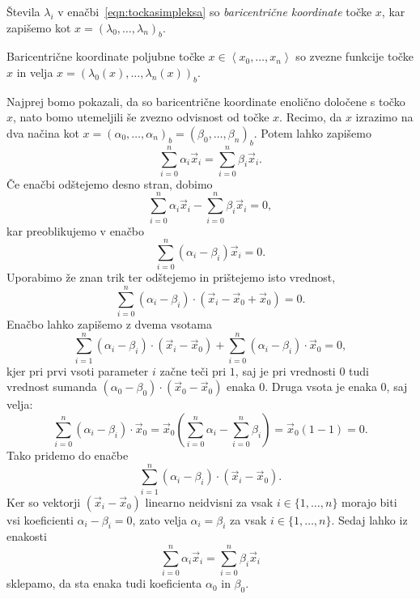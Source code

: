 \documentclass[mat1]{fmfdelo}
\newcommand{\0}{\underline{0}}
\begin{document}
Števila $\lambda_i$ v enačbi~\eqref{eqn:tockasimpleksa} so \emph{baricentrične koordinate} točke $x$, kar zapišemo kot $x = (\lambda_0, \dots, \lambda_n)_b$.
\begin{trditev}\label{trd:zveznost-baricentra}
Baricentrične koordinate poljubne točke $x \in \left <x_0, \dots, x_n \right >$ so zvezne funkcije točke $x$ in velja $x = (\lambda_0(x), \dots, \lambda_n(x))_b$.
\end{trditev}
\begin{dokaz}
Najprej bomo pokazali, da so baricentrične koordinate enolično določene s točko $x$, nato bomo utemeljili še zvezno odvisnost od točke $x$. Recimo, da $x$ izrazimo na dva načina kot $x = \left (\alpha_0, \dots, \alpha_n \right )_b = \left (\beta_0, \dots, \beta_n \right )_b$. Potem lahko zapišemo 
$$\sum_{i=0}^n \alpha_i \vec{x}_i = \sum_{i=0}^n \beta_i \vec{x}_i.$$
Če enačbi odštejemo desno stran, dobimo 
$$\sum_{i=0}^n \alpha_i \vec{x}_i - \sum_{i=0}^n \beta_i \vec{x}_i = 0,$$
kar preoblikujemo v enačbo
$$\sum_{i=0}^n (\alpha_i - \beta_i) \vec{x}_i  = 0.$$
Uporabimo že znan trik ter odštejemo in prištejemo isto vrednost,
$$\sum_{i=0}^n (\alpha_i  - \beta_i) \cdot (\vec{x}_i - \vec{x}_0 + \vec{x}_0) = 0.$$
Enačbo lahko zapišemo z dvema vsotama
$$\sum_{i=1}^n (\alpha_i  - \beta_i) \cdot (\vec{x}_i -\vec{x}_0) + \sum_{i=0}^n (\alpha_i  - \beta_i) \cdot \vec{x}_0= 0,$$
kjer pri prvi vsoti parameter $i$ začne teči pri $1$, saj je pri vrednosti $0$ tudi vrednost sumanda  $(\alpha_0 - \beta_0) \cdot (\vec{x}_0 -\vec{x}_0)$ enaka $0$. Druga vsota je enaka $0$, saj velja:
$$\sum_{i=0}^n (\alpha_i  - \beta_i) \cdot \vec{x}_0= \vec{x}_0 \left (\sum_{i=0}^n \alpha_i  - \sum_{i=0}^n \beta_i \right) = \vec{x}_0 (1 - 1)= 0.$$
Tako pridemo do enačbe 
$$\sum_{i=1}^n (\alpha_i  - \beta_i) \cdot (\vec{x}_i - \vec{x}_0).$$
Ker so vektorji $(\vec{x}_i - \vec{x}_0)$ linearno neidvisni za vsak $i \in \{ 1, \dots, n \}$ morajo biti vsi koeficienti $\alpha_i  - \beta_i = 0$, zato velja $\alpha_i  = \beta_i$ za vsak $i \in \{ 1, \dots, n \}$. Sedaj lahko iz enakosti
$$\sum_{i=0}^n \alpha_i \vec{x}_i = \sum_{i=0}^n \beta_i \vec{x}_i$$
sklepamo, da sta enaka tudi koeficienta $\alpha_0$ in $\beta_0$.


\end{dokaz}
\end{document}
